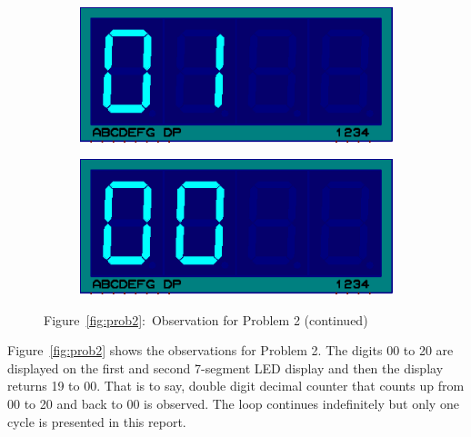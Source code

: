 \documentclass{lab_sheet}
\begin{document}
\begin{figure}[H]
          \begin{subfigure}{.33\textwidth}
            \centering
            \includegraphics[frame,width=.9\linewidth]{../Figures/d1}   
            \caption{}
            \label{fig:prob2-a14}
          \end{subfigure}
          \begin{subfigure}{.33\textwidth}
            \centering
            \includegraphics[frame,width=.9\linewidth]{../Figures/d0}   
            \caption{}
            \label{fig:prob2-a15}
          \end{subfigure}
          \hspace*{\fill}
        \caption*{Figure~\ref{fig:prob2}:~Observation for Problem 2 (continued)}
    \end{figure}
    Figure~\ref{fig:prob2} shows the observations for Problem 2. The digits 00 to 20 are displayed on the first and second 7-segment LED display and then the display returns 19 to 00. That is to say, double digit decimal counter that counts up from 00 to 20 and back to 00 is observed. The loop continues indefinitely but only one cycle is presented in this report.
\end{document}
